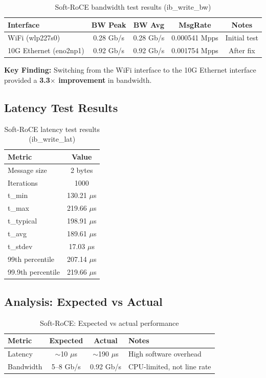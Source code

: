 \documentclass[10pt,letterpaper]{article}
\begin{document}
\begin{table}[H]
\centering
\small
\begin{tabular}{@{}lcccc@{}}
\toprule
\textbf{Interface} & \textbf{BW Peak} & \textbf{BW Avg} & \textbf{MsgRate} & \textbf{Notes} \\
\midrule
WiFi (wlp227s0) & 0.28 Gb/s & 0.28 Gb/s & 0.000541 Mpps & Initial test \\
10G Ethernet (eno2np1) & 0.92 Gb/s & 0.92 Gb/s & 0.001754 Mpps & After fix \\
\bottomrule
\end{tabular}
\caption{Soft-RoCE bandwidth test results (ib\_write\_bw)}
\end{table}

\textbf{Key Finding:} Switching from the WiFi interface to the 10G Ethernet interface provided a \textbf{3.3$\times$ improvement} in bandwidth.

\subsection{Latency Test Results}

\begin{table}[H]
\centering
\small
\begin{tabular}{@{}lc@{}}
\toprule
\textbf{Metric} & \textbf{Value} \\
\midrule
Message size & 2 bytes \\
Iterations & 1000 \\
t\_min & 130.21 $\mu$s \\
t\_max & 219.66 $\mu$s \\
t\_typical & 198.91 $\mu$s \\
t\_avg & 189.61 $\mu$s \\
t\_stdev & 17.03 $\mu$s \\
99th percentile & 207.14 $\mu$s \\
99.9th percentile & 219.66 $\mu$s \\
\bottomrule
\end{tabular}
\caption{Soft-RoCE latency test results (ib\_write\_lat)}
\end{table}

\subsection{Analysis: Expected vs Actual}

\begin{table}[H]
\centering
\small
\begin{tabular}{@{}lccp{5cm}@{}}
\toprule
\textbf{Metric} & \textbf{Expected} & \textbf{Actual} & \textbf{Notes} \\
\midrule
Latency & $\sim$10 $\mu$s & $\sim$190 $\mu$s & High software overhead \\
Bandwidth & 5--8 Gb/s & 0.92 Gb/s & CPU-limited, not line rate \\
\bottomrule
\end{tabular}
\caption{Soft-RoCE: Expected vs actual performance}
\end{table}
\end{document}
